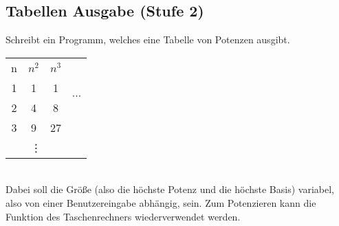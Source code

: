 \subsection{Tabellen Ausgabe (Stufe 2)}
Schreibt ein Programm, welches eine Tabelle von Potenzen ausgibt.\\
\begin{tabular}{|c|c|c|c}\cline{1-3}
    n & $n^2$ & $n^3$          & \multirow{4}{*}{$\cdots$} \\\cline{1-3}
    1 & 1     & 1              &                           \\\cline{1-3}
    2 & 4     & 8              &                           \\\cline{1-3}
    3 & 9     & 27             &                           \\\cline{1-3}
    \multicolumn{3}{c}{\vdots}
\end{tabular}\\
Dabei soll die Größe (also die höchste Potenz und die höchste Basis) variabel,
also von einer Benutzereingabe abhängig, sein. Zum Potenzieren kann die Funktion
des Taschenrechners wiederverwendet werden.
